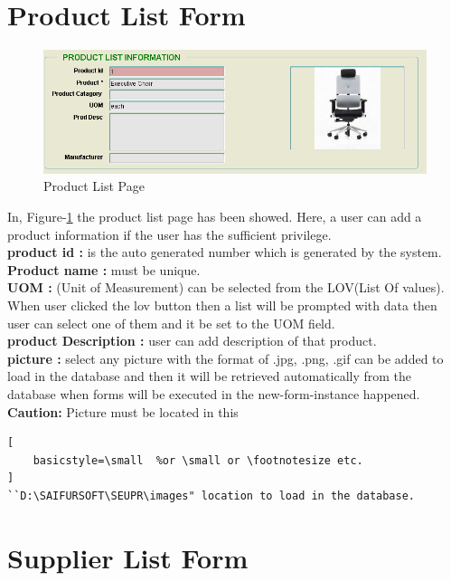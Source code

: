 \documentclass[12pt]{report} %
\begin{document}
\section{Product List Form}
\begin{figure}[h]
	\includegraphics[width=1\textwidth]{pic/product_list_page.PNG}
	\caption{Product List Page}
	\label{fig:product_list_page}
\end{figure}
In, Figure-\ref{fig:product_list_page} the product list page has been showed. Here, a user can add a product information if the user has the sufficient privilege.\\ 
\textbf{product id :} is the auto generated number which is generated by the system.\\
\textbf{Product name : } must be unique. \\
\textbf{UOM :} (Unit of Measurement) can be selected from the LOV(List Of values). When user clicked the lov button then a list will be prompted with data then user can select one of them and it be set to the UOM field. \\
\textbf{product Description : } user can add description of that product.\\
 \textbf{picture :} select any picture with the format of .jpg, .png, .gif can be added to load in the database and then it will be retrieved automatically from the database when forms will be executed in the new-form-instance happened. \textbf{Caution: } Picture must be located in this 
 \ifx
 \begin{lstlisting}[
    basicstyle=\small  %or \small or \footnotesize etc.
]
``D:\SAIFURSOFT\SEUPR\images" location to load in the database.
\end{lstlisting} 
\fi


\section{Supplier List Form}
\end{document}
